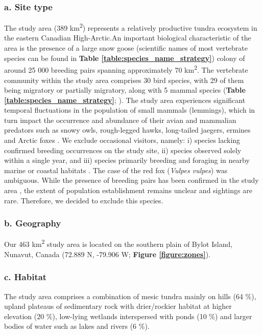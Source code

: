 \documentclass[a4paper,twoside,12pt]{article}
\begin{document}
 			\subsubsection*{a. Site type}
  The study area (389 km\textsuperscript{2}) represents a relatively productive tundra ecosystem in the eastern Canadian High-Arctic.An important biological characteristic of the area is the presence of a large snow goose (scientific names of most vertebrate species can be found in \textbf{Table \ref{table:species_name_strategy}}) colony of around 25 000 breeding pairs \citep{reed2002} spanning approximately 70 km\textsuperscript{2}. The vertebrate community within the study area comprises 30 bird species, with 29 of them being migratory or partially migratory, along with 5 mammal species (\textbf{Table \ref{table:species_name_strategy}}; \citet{moisan2023, gauthier2024a}). The study area experiences significant temporal fluctuations in the population of small mammals (lemmings), which in turn impact the occurrence and abundance of their avian and mammalian predators such as snowy owls, rough-legged hawks, long-tailed jaegers, ermines and Arctic foxes \citep{legagneux2012, duchesne2021}. We exclude occasional visitors, namely: i) species lacking confirmed breeding occurrences on the study site, ii) species observed solely within a single year, and iii) species primarily breeding and foraging in nearby marine or coastal habitats \citep{moisan2023}. The case of the red fox (\textit{Vulpes vulpes}) was ambiguous. While the presence of breeding pairs has been confirmed in the study area \citep{lai2022}, the extent of population establishment remains unclear and sightings are rare. Therefore, we decided to exclude this species.

         		
\newpage
            	\subsubsection*{b. Geography} Our 463 km\textsuperscript{2} study area is located on the southern plain of Bylot Island, Nunavut, Canada (72.889 N, -79.906 W; \textbf{Figure \ref{figure:zones}}).
            	\subsubsection*{c. Habitat}  The study area comprises a combination of mesic tundra mainly on hills (64 \%), upland plateaus of sedimentary rock with drier/rockier habitat at higher elevation (20 \%), low-lying wetlands interspersed with ponds (10 \%) and larger bodies of water such as lakes and rivers (6 \%).
\end{document}
